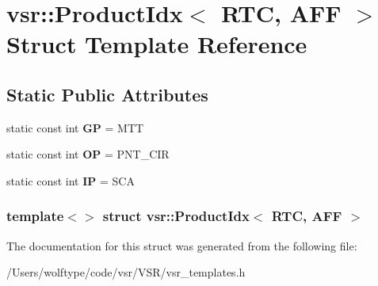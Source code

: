 \hypertarget{structvsr_1_1_product_idx_3_01_r_t_c_00_01_a_f_f_01_4}{\section{vsr\-:\-:Product\-Idx$<$ R\-T\-C, A\-F\-F $>$ Struct Template Reference}
\label{structvsr_1_1_product_idx_3_01_r_t_c_00_01_a_f_f_01_4}
}
\subsection*{Static Public Attributes}
\begin{DoxyCompactItemize}
\item 
\hypertarget{structvsr_1_1_product_idx_3_01_r_t_c_00_01_a_f_f_01_4_a8e19448f73b0dba2ad0f44c3347e9955}{static const int {\bfseries G\-P} = M\-T\-T}\label{structvsr_1_1_product_idx_3_01_r_t_c_00_01_a_f_f_01_4_a8e19448f73b0dba2ad0f44c3347e9955}

\item 
\hypertarget{structvsr_1_1_product_idx_3_01_r_t_c_00_01_a_f_f_01_4_a2584e80d47be4d7f6dea2596a69f8e68}{static const int {\bfseries O\-P} = P\-N\-T\-\_\-\-C\-I\-R}\label{structvsr_1_1_product_idx_3_01_r_t_c_00_01_a_f_f_01_4_a2584e80d47be4d7f6dea2596a69f8e68}

\item 
\hypertarget{structvsr_1_1_product_idx_3_01_r_t_c_00_01_a_f_f_01_4_a2ad7e9a8fd47fc302f9863e969716701}{static const int {\bfseries I\-P} = S\-C\-A}\label{structvsr_1_1_product_idx_3_01_r_t_c_00_01_a_f_f_01_4_a2ad7e9a8fd47fc302f9863e969716701}

\end{DoxyCompactItemize}
\subsubsection*{template$<$$>$ struct vsr\-::\-Product\-Idx$<$ R\-T\-C, A\-F\-F $>$}



The documentation for this struct was generated from the following file\-:\begin{DoxyCompactItemize}
\item 
/\-Users/wolftype/code/vsr/\-V\-S\-R/vsr\-\_\-templates.\-h\end{DoxyCompactItemize}
